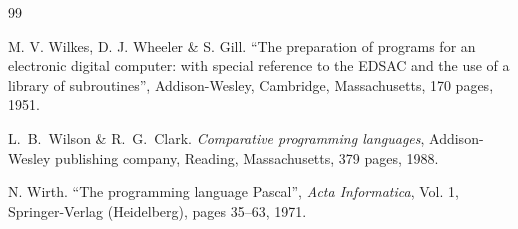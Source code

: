 \begin{thebibliography}{99}

 M. V. Wilkes, D. J. Wheeler \& S. Gill. 
``The preparation of programs for an electronic digital computer: with special reference to 
the EDSAC and the use of a library of subroutines'', Addison-Wesley, Cambridge, 
Massachusetts, 170 pages, 1951.

 L.~B.~Wilson \& R.~G.~Clark.
{\em Comparative programming languages},  Addison-Wesley publishing company,
 Reading, Massachusetts, 379 pages, 1988.

 N. Wirth.
``The programming language Pascal'', {\em Acta Informatica}, Vol. 1, Springer-Verlag (Heidelberg), 
pages 35--63, 1971.

\end{thebibliography}

